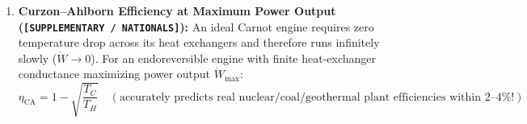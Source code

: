 \begin{formulacard}
\begin{enumerate}
\begin{itemize}
{\begin{equation}
    \end{equation}}
  \end{itemize}
  \item \textbf{Curzon--Ahlborn Efficiency at Maximum Power Output (\texttt{[SUPPLEMENTARY / NATIONALS]}):}
  An ideal Carnot engine requires zero temperature drop across its heat exchangers and therefore runs infinitely slowly ($\dot{W} \to 0$). For an endoreversible engine with finite heat-exchanger conductance maximizing power output $\dot{W}_{\max}$:
  \begin{equation}\label{eq:09:curzon-ahlborn}
    \boxed{\eta_{\mathrm{CA}} = 1 - \sqrt{\frac{T_C}{T_H}}} \quad (\text{accurately predicts real nuclear/coal/geothermal plant efficiencies within } 2\text{--}4\%!)
  \end{equation}
\end{enumerate}
\end{formulacard}

